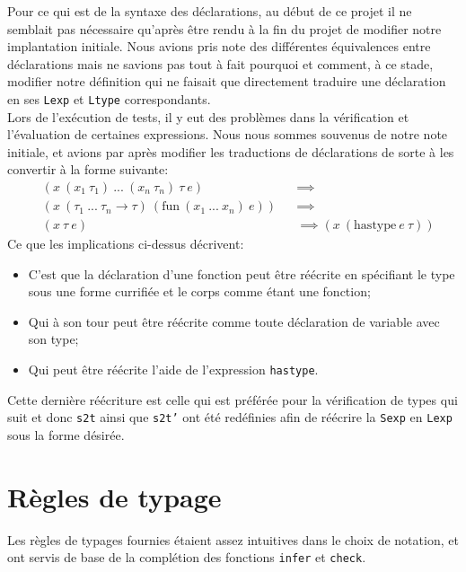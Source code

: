 \documentclass[10pt, titlepage]{article}
\begin{document}
Pour ce qui est de la syntaxe des déclarations, au début de ce projet il ne
semblait pas nécessaire qu'après être rendu à la fin du projet de modifier
notre implantation initiale. Nous avions pris note des différentes équivalences
entre déclarations mais ne savions pas tout à fait pourquoi et comment, à ce
stade, modifier notre définition qui ne faisait que directement traduire une
déclaration en ses \texttt{Lexp} et \texttt{Ltype} correspondants. \\
Lors de l'exécution de tests, il y eut des problèmes dans la vérification et
l'évaluation de certaines expressions. Nous nous sommes souvenus de notre note
initiale, et avions par après modifier les traductions de déclarations de sorte
à les convertir à la forme suivante:
\begin{equation*}
    \begin{aligned}
        & (x \ (x_1 \ \tau_1) \ ... \ (x_n \ \tau_n) \ \tau \ e) && \implies \\
        & (x \ (\tau_1 \ ... \ \tau_n \rightarrow \tau) \ (\text{fun} \
            (x_1 \ ... \ x_n) \ e)) && \implies \\
        & (x \ \tau \ e) && \implies (x \ (\text{hastype} \ e \ \tau))
    \end{aligned}
\end{equation*}
Ce que les implications ci-dessus décrivent:
\begin{itemize}
    \item C'est que la déclaration d'une fonction peut être réécrite en
    spécifiant le type sous une forme currifiée et le corps comme étant une
    fonction;
    \item Qui à son tour peut être réécrite comme toute déclaration de variable
    avec son type;
    \item Qui peut être réécrite l'aide de l'expression \texttt{hastype}.
\end{itemize}
Cette dernière réécriture est celle qui est préférée pour la vérification de
types qui suit et donc \texttt{s2t} ainsi que \texttt{s2t'} ont été redéfinies
afin de réécrire la \texttt{Sexp} en \texttt{Lexp} sous la forme désirée.

\section{Règles de typage}

Les règles de typages fournies étaient assez intuitives dans le choix de
notation, et ont servis de base de la complétion des fonctions \texttt{infer}
et \texttt{check}.
\end{document}
